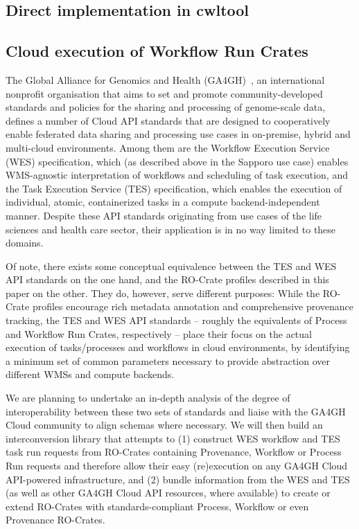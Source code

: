 \documentclass[10pt,letterpaper]{article}
\begin{document}
\hypertarget{direct-implementation-in-cwltool}{%
\subsection{Direct implementation in cwltool}\label{direct-implementation-in-cwltool}}

\hypertarget{cloud-execution-of-workflow-run-crates}{%
\subsection{Cloud execution of Workflow Run Crates}\label{cloud-execution-of-workflow-run-crates}}

The Global Alliance for Genomics and Health (GA4GH)~\cite{GA4GH}, an international nonprofit organisation that aims to set and promote community-developed standards and policies for the sharing and processing of genome-scale data, defines a number of Cloud API standards that are designed to cooperatively enable federated data sharing and processing use cases in on-premise, hybrid and multi-cloud environments.
Among them are the Workflow Execution Service (WES) specification, which (as described above in the Sapporo use case) enables WMS-agnostic interpretation of workflows and scheduling of task execution, and the Task Execution Service (TES) specification, which enables the execution of individual, atomic, containerized tasks in a compute backend-independent manner.
Despite these API standards originating from use cases of the life sciences and health care sector, their application is in no way limited to these domains.

Of note, there exists some conceptual equivalence between the TES and WES API standards on the one hand, and the RO-Crate profiles described in this paper on the other.
They do, however, serve different purposes:
While the RO-Crate profiles encourage rich metadata annotation and comprehensive provenance tracking, the TES and WES API standards --
roughly the equivalents of Process and Workflow Run Crates, respectively -- place their focus on the actual execution of tasks/processes and workflows in cloud environments, by identifying a minimum set of common parameters necessary to provide abstraction over different WMSs and compute backends.

We are planning to undertake an in-depth analysis of the degree of interoperability between these two sets of standards and liaise with the GA4GH Cloud community to align schemas where necessary.
We will then build an interconversion library that attempts to (1) construct WES workflow and TES task run requests from RO-Crates containing Provenance, Workflow or Process Run requests and therefore allow their easy (re)execution on any GA4GH Cloud API-powered infrastructure, and (2) bundle information from the WES and TES (as well as other GA4GH Cloud API resources, where available) to create or extend RO-Crates with standards-compliant Process, Workflow or even Provenance RO-Crates.
\end{document}

